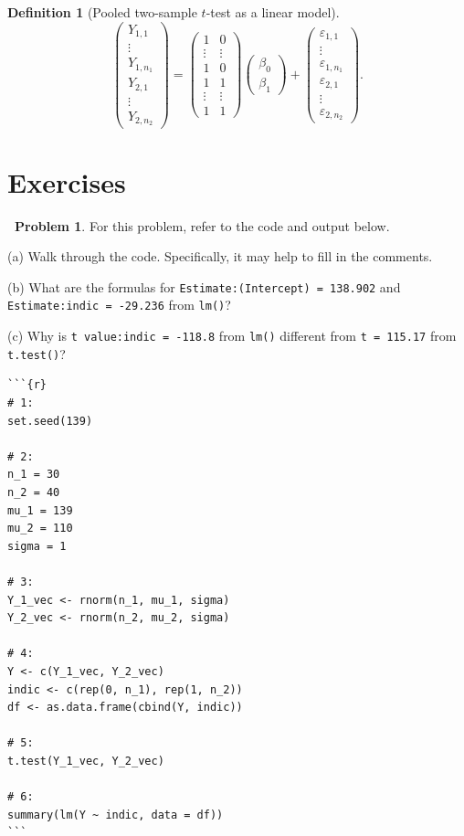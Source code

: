 \documentclass[12pt,oneside]{article}
\theoremstyle{definition}
\newtheorem{definition}{Definition}
\newtheorem{problem}{\faPen \ Problem}
\theoremstyle{remark}
\begin{document}
\begin{definition}[Pooled two-sample $t$-test as a linear model]
\[
\begin{pmatrix}
Y_{1, 1} \\
\vdots \\
Y_{1, n_1} \\
Y_{2, 1} \\
\vdots \\
Y_{2, n_2}
\end{pmatrix}
=
\begin{pmatrix}
1 & 0 \\
\vdots & \vdots \\
1 & 0 \\
1 & 1 \\
\vdots & \vdots \\
1 & 1
\end{pmatrix}
\begin{pmatrix}
\beta_{0} \\
\beta_{1}
\end{pmatrix}
+
\begin{pmatrix}
\varepsilon_{1, 1} \\
\vdots \\
\varepsilon_{1, n_1} \\
\varepsilon_{2, 1} \\
\vdots \\
\varepsilon_{2, n_2}
\end{pmatrix}.
\]
\end{definition}

\section{Exercises}

\begin{problem}
For this problem, refer to the code and output below.

(a) Walk through the code. Specifically, it may help to fill in the comments.

(b) What are the formulas for \texttt{Estimate:(Intercept) = 138.902} and \texttt{Estimate:indic = -29.236} from \texttt{lm()}?

(c) Why is \texttt{t value:indic = -118.8} from \texttt{lm()} different from \texttt{t = 115.17} from \texttt{t.test()}? 
\end{problem}

\begin{lstlisting}
```{r}
# 1: 
set.seed(139)

# 2: 
n_1 = 30
n_2 = 40
mu_1 = 139
mu_2 = 110
sigma = 1

# 3: 
Y_1_vec <- rnorm(n_1, mu_1, sigma)
Y_2_vec <- rnorm(n_2, mu_2, sigma)

# 4: 
Y <- c(Y_1_vec, Y_2_vec)
indic <- c(rep(0, n_1), rep(1, n_2))
df <- as.data.frame(cbind(Y, indic))

# 5: 
t.test(Y_1_vec, Y_2_vec)

# 6: 
summary(lm(Y ~ indic, data = df))
```
\end{lstlisting}
\end{document}
